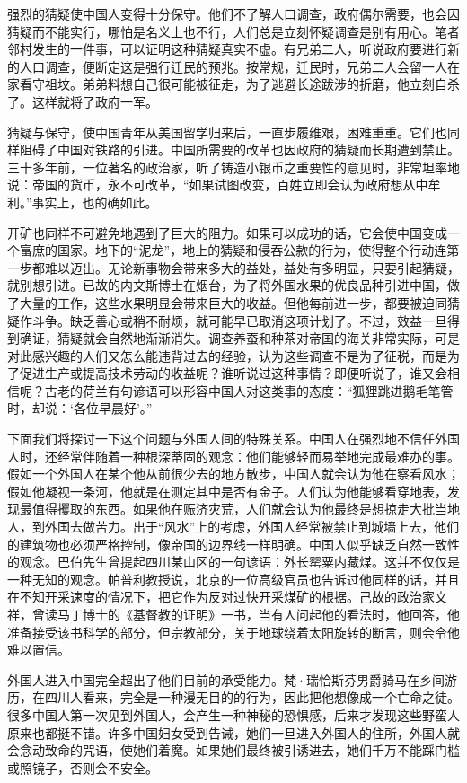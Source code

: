 \documentclass[12pt,oneside]{book}
\begin{document}
\begin{common-format}
强烈的猜疑使中国人变得十分保守。他们不了解人口调查，政府偶尔需要，也会因猜疑而不能实行，哪怕是名义上也不行，人们总是立刻怀疑调查是别有用心。笔者邻村发生的一件事，可以证明这种猜疑真实不虚。有兄弟二人，听说政府要进行新的人口调查，便断定这是强行迁民的预兆。按常规，迁民时，兄弟二人会留一人在家看守祖坟。弟弟料想自己很可能被征走，为了逃避长途跋涉的折磨，他立刻自杀了。这样就将了政府一军。 

猜疑与保守，使中国青年从美国留学归来后，一直步履维艰，困难重重。它们也同样阻碍了中国对铁路的引进。中国所需要的改革也因政府的猜疑而长期遭到禁止。三十多年前，一位著名的政治家，听了铸造小银币之重要性的意见时，非常坦率地说：帝国的货币，永不可改革，“如果试图改变，百姓立即会认为政府想从中牟利。”事实上，也的确如此。 

开矿也同样不可避免地遇到了巨大的阻力。如果可以成功的话，它会使中国变成一个富庶的国家。地下的“泥龙”，地上的猜疑和侵吞公款的行为，使得整个行动连第一步都难以迈出。无论新事物会带来多大的益处，益处有多明显，只要引起猜疑，就别想引进。已故的内文斯博士在烟台，为了将外国水果的优良品种引进中国，做了大量的工作，这些水果明显会带来巨大的收益。但他每前进一步，都要被迫同猜疑作斗争。缺乏善心或稍不耐烦，就可能早已取消这项计划了。不过，效益一旦得到确证，猜疑就会自然地渐渐消失。调查养蚕和种茶对帝国的海关非常实际，可是对此感兴趣的人们又怎么能违背过去的经验，认为这些调查不是为了征税，而是为了促进生产或提高技术劳动的收益呢？谁听说过这种事情？即便听说了，谁又会相信呢？古老的荷兰有句谚语可以形容中国人对这类事的态度：“狐狸跳进鹅毛笔管时，却说：‘各位早晨好’。” 

下面我们将探讨一下这个问题与外国人间的特殊关系。中国人在强烈地不信任外国人时，还经常伴随着一种根深蒂固的观念：他们能够轻而易举地完成最难办的事。假如一个外国人在某个他从前很少去的地方散步，中国人就会认为他在察看风水；假如他凝视一条河，他就是在测定其中是否有金子。人们认为他能够看穿地表，发现最值得攫取的东西。如果他在赈济灾荒，人们就会认为他最终是想掠走大批当地人，到外国去做苦力。出于“风水”上的考虑，外国人经常被禁止到城墙上去，他们的建筑物也必须严格控制，像帝国的边界线一样明确。中国人似乎缺乏自然一致性的观念。巴伯先生曾提起四川某山区的一句谚语：外长罂粟内藏煤。这并不仅仅是一种无知的观念。帕普利教授说，北京的一位高级官员也告诉过他同样的话，并且在不知开采速度的情况下，把它作为反对过快开采煤矿的根据。己故的政治家文祥，曾读马丁博士的《基督教的证明》一书，当有人问起他的看法时，他回答，他准备接受该书科学的部分，但宗教部分，关于地球绕着太阳旋转的断言，则会令他难以置信。 

外国人进入中国完全超出了他们目前的承受能力。梵·瑞恰斯芬男爵骑马在乡间游历，在四川人看来，完全是一种漫无目的的行为，因此把他想像成一个亡命之徒。很多中国人第一次见到外国人，会产生一种神秘的恐惧感，后来才发现这些野蛮人原来也都挺不错。许多中国妇女受到告诫，她们一旦进入外国人的住所，外国人就会念动致命的咒语，使她们着魔。如果她们最终被引诱进去，她们千万不能踩门槛或照镜子，否则会不安全。 


\end{common-format}
\end{document}

